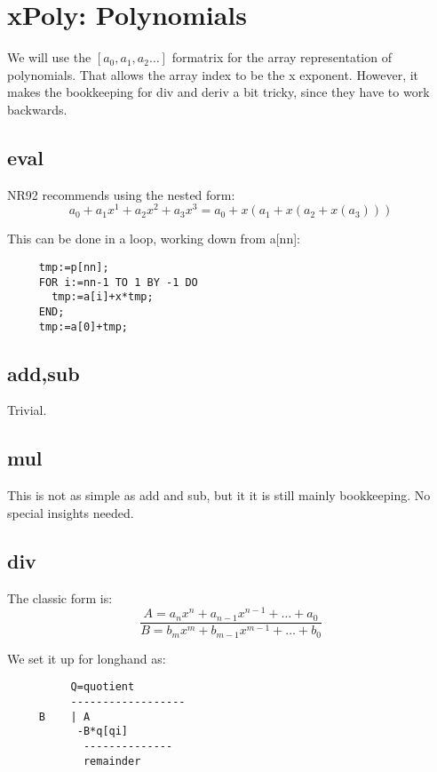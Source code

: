 \section{xPoly: Polynomials}
We will use the $[a_0,a_1,a_2 \dots]$ formatrix for the array
representation of polynomials.  That allows the array index
to be the x exponent.  However, it makes the bookkeeping for
div and deriv a bit tricky, since they have to work
backwards.

\subsection*{eval}
NR92 recommends using the nested form:
\begin{equation}
    a_0 + a_1 x^1 + a_2 x^2 + a_3 x^3
      = a_0+ x(a_1+x(a_2+x(a_3)))
\end{equation}

This can be done in a loop, working down from a[nn]:
\begin{tt} \begin{verbatim}
     tmp:=p[nn];
     FOR i:=nn-1 TO 1 BY -1 DO
       tmp:=a[i]+x*tmp;
     END;
     tmp:=a[0]+tmp;
\end{verbatim}  \end{tt}
   
\subsection*{add,sub}
Trivial.

\subsection*{mul}
This is not as simple as add and sub, but it it is still
mainly bookkeeping.  No special insights needed.

\subsection*{div}
The classic form is:
\begin{equation}
   \frac{A=a_n x^n+a_{n-1} x^{n-1}+\dots+a_0}
     {B=b_m x^m+b_{m-1} x^{m-1}+\dots+b_0}
\end{equation}

We set it up for longhand as:
\begin{tt} \begin{verbatim}
          Q=quotient
          ------------------
     B    | A
           -B*q[qi]
            --------------
            remainder
\end{verbatim} \end{tt}

